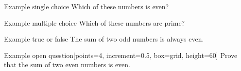%

\begin{scq}{Example single choice}
Which of these numbers is even?
\begin{choices}
\end{choices}
\end{scq}

\begin{mcq}{Example multiple choice}
Which of these numbers are prime?
\begin{choices}
\end{choices}
\end{mcq}

\begin{tf}{Example true or false}
The sum of two odd numbers is always even.
\end{tf}

\begin{open}{Example open question}[points=4, increment=0.5, box=grid, height=60]
Prove that the sum of two even numbers is even.
\end{open}
